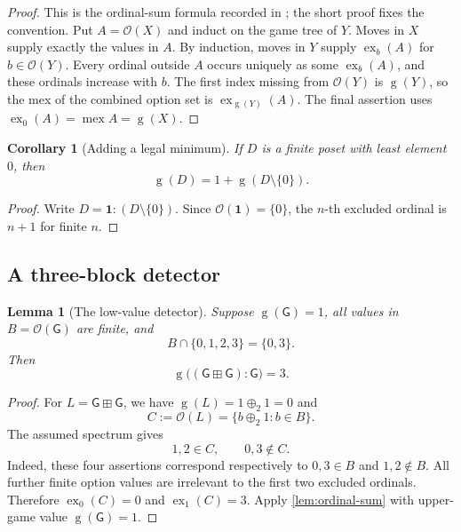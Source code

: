 \documentclass[11pt,letterpaper]{article}
\numberwithin{equation}{section}
\newtheorem{lemma}[theorem]{Lemma}
\newtheorem{corollary}[theorem]{Corollary}
\theoremstyle{definition}
\newcommand{\Gr}{\operatorname{g}}
\newcommand{\mex}{\operatorname{mex}}
\newcommand{\ex}{\operatorname{ex}}
\newcommand{\Opt}{\mathcal O}
\newcommand{\ps}{\mathbin{\boxplus}}
\newcommand{\xo}{\mathbin{\oplus_{\!2}}}
\renewcommand{\Game}{\mathsf G}
\begin{document}
\begin{proof}
This is the ordinal-sum formula recorded in
\cite[Theorem~2.6]{GT}; the short proof fixes the convention.
Put $A=\Opt(X)$ and induct on the game tree of $Y$. Moves in $X$ supply
exactly the values in $A$. By induction, moves in $Y$ supply
$\ex_b(A)$ for $b\in\Opt(Y)$. Every ordinal outside $A$ occurs uniquely
as some $\ex_b(A)$, and these ordinals increase with $b$. The first index
missing from $\Opt(Y)$ is $\Gr(Y)$, so the mex of the combined option set
is $\ex_{\Gr(Y)}(A)$. The final assertion uses
$\ex_0(A)=\mex A=\Gr(X)$.
\end{proof}

\begin{corollary}[Adding a legal minimum]\label{cor:min-shift}
If $D$ is a finite poset with least element $0$, then
\begin{equation}\label{eq:min-shift}
 \Gr(D)=1+\Gr(D\setminus\{0\}).
\end{equation}
\end{corollary}
\begin{proof}
Write $D=\mathbf1:(D\setminus\{0\})$. Since
$\Opt(\mathbf1)=\{0\}$, the $n$-th excluded ordinal is $n+1$ for finite $n$.
\end{proof}

\subsection{A three-block detector}

\begin{lemma}[The low-value detector]\label{lem:detector}
Suppose $\Gr(\Game)=1$, all values in $B=\Opt(\Game)$ are finite, and
\begin{equation}\label{eq:low-spectrum}
 B\cap\{0,1,2,3\}=\{0,3\}.
\end{equation}
Then
\begin{equation}\label{eq:detector}
 \Gr\bigl((\Game\ps\Game):\Game\bigr)=3.
\end{equation}
\end{lemma}

\begin{proof}
For $L=\Game\ps\Game$, we have $\Gr(L)=1\xo1=0$ and
\[
 C:=\Opt(L)=\{b\xo1:b\in B\}.
\]
The assumed spectrum gives
\[
 1,2\in C,\qquad 0,3\notin C.
\]
Indeed, these four assertions correspond respectively to
$0,3\in B$ and $1,2\notin B$. All further finite option values are irrelevant
to the first two excluded ordinals. Therefore
$\ex_0(C)=0$ and $\ex_1(C)=3$. Apply \cref{lem:ordinal-sum} with upper-game
value $\Gr(\Game)=1$.
\end{proof}
\end{document}
